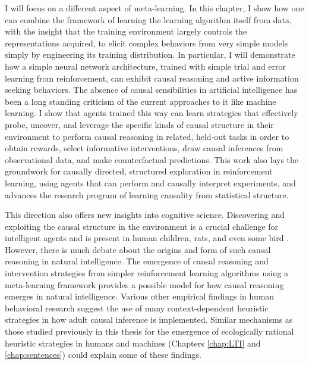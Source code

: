 I will focus on a different aspect of meta-learning. In this chapter, I show how one can combine the framework of learning the learning algorithm itself from data, with the insight that the training environment largely controls the representations acquired, to elicit complex behaviors from very simple models simply by engineering its training distribution. In particular, I will demonstrate how a simple neural network architecture, trained with simple trial and error learning from reinforcement, can exhibit causal reasoning and active information seeking behaviors. The absence of causal sensibilities in artificial intelligence has been a long standing criticism of the current approaches to it like machine learning\citep{pearl88probabilistic, pearl2000}. I show that agents trained this way can learn strategies that effectively probe, uncover, and leverage the specific kinds of causal structure in their environment to perform causal reasoning in related, held-out tasks in order to obtain rewards, select informative interventions, draw causal inferences from observational data, and make counterfactual predictions. This work also lays the groundwork for causally directed, structured exploration in reinforcement learning, using agents that can perform and causally interpret experiments, and advances the research program of learning causality from statistical structure.

This direction also offers new insights into cognitive science. Discovering and exploiting the causal structure in the environment is a crucial challenge for intelligent agents and is present in human children, rats, and even some bird \citep{leslie1982perception,gopnik2001causal,gopnik2004theory,blaisdell2006causal, lagnado2013causal}. However, there is much debate about the origins and form of such causal reasoning in natural intelligence\citep{waldmann2013causal, cartwright2004causation}. The emergence of causal reasoning and intervention strategies from simpler reinforcement learning algorithms using a meta-learning framework provides a possible model for how causal reasoning emerges in natural intelligence. Various other empirical findings in human behavioral research suggest the use of many context-dependent heuristic strategies in how adult causal inference is implemented. Similar mechanisms as those studied previously in this thesis for the emergence of ecologically rational heuristic strategies in humans and machines (Chapters \ref{chap:LTI} and \ref{chap:sentences}) could explain some of these findings. 


